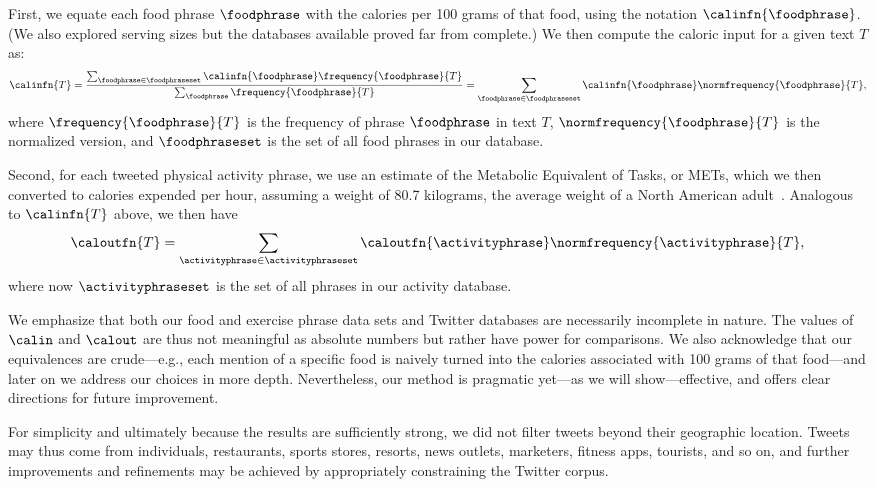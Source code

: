 First, we equate each food phrase $\foodphrase$
with the calories per 100 grams of that food,
using the notation
$\calinfn{\foodphrase}$.
(We also explored serving sizes but the databases 
available proved far from complete.)
We then compute the caloric input
for a given text $T$ as:
\begin{equation}
  \calinfn{T}
  = 
  \frac{
    \sum_{\foodphrase \in \foodphraseset}
    \calinfn{\foodphrase}
    \frequency{\foodphrase}{T}
  }
  {
    \sum_{\foodphrase}
    \frequency{\foodphrase}{T}
  }
  = 
    \sum_{\foodphrase \in \foodphraseset}
    \calinfn{\foodphrase}
    \normfrequency{\foodphrase}{T},
  \label{eq:fluxwell.calin}
\end{equation}
where $\frequency{\foodphrase}{T}$ 
is the frequency of phrase $\foodphrase$ 
in text $T$,
$\normfrequency{\foodphrase}{T}$
is the normalized version,
and 
$\foodphraseset$
is the set of all food phrases in our database.

Second, for each tweeted physical activity phrase, 
we use an estimate of the Metabolic Equivalent of Tasks, or METs,
which we then converted to calories expended per hour,
assuming a weight of 80.7 kilograms, the average weight of a North American
adult~\cite{walpole2012}.
Analogous to $\calinfn{T}$ above, 
we then have
\begin{equation}
  \caloutfn{T}
  = 
  \sum_{\activityphrase \in \activityphraseset}
  \caloutfn{\activityphrase}
  \normfrequency{\activityphrase}{T},
  \label{eq:fluxwell.calout}
\end{equation}
where now 
$\activityphraseset$
is the set of all phrases in our activity database.

We emphasize that both our food and exercise phrase data sets 
and Twitter databases are necessarily incomplete in nature.
The values of $\calin$ and $\calout$ are thus not meaningful as
absolute numbers but rather have power for comparisons.
We also acknowledge that our equivalences are crude---e.g., each mention
of a specific food is naively turned into the calories associated with 100 grams of
that food---and later on we address our choices in more depth.
Nevertheless, our method is pragmatic yet---as we will
show---effective, and offers clear directions for future improvement.

For simplicity and ultimately because the results are sufficiently
strong, we did not filter tweets beyond their geographic location.
Tweets may thus come from individuals, restaurants, sports stores,
resorts, news outlets, marketers, fitness apps, tourists, and so on,
and further improvements and refinements may be achieved by
appropriately constraining the Twitter corpus.

